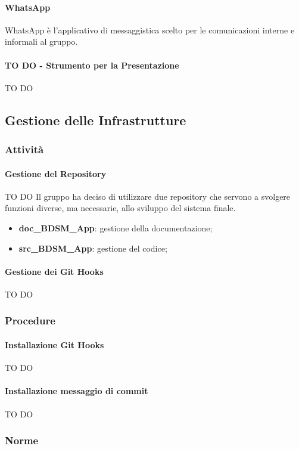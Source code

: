 			\paragraph{WhatsApp}
			WhatsApp è l'applicativo di messaggistica scelto per le comunicazioni interne e informali al gruppo.
			\paragraph{TO DO - Strumento per la Presentazione}
			TO DO


	\subsection{Gestione delle Infrastrutture}
		\subsubsection{Attività}
			\paragraph{Gestione del Repository}
			TO DO
			Il gruppo ha deciso di utilizzare due repository che servono a svolgere funzioni diverse, ma necessarie, allo sviluppo del sistema finale.
				\begin{itemize}
					\item \textbf{doc\_BDSM\_App}: gestione della documentazione;
					\item \textbf{src\_BDSM\_App}: gestione del codice;
				\end{itemize}
			\paragraph{Gestione dei Git Hooks}
			TO DO
			
		\subsubsection{Procedure}
			\paragraph{Installazione Git Hooks}
			TO DO
			\paragraph{Installazione messaggio di commit}
			TO DO
			
			
		\subsubsection{Norme}

